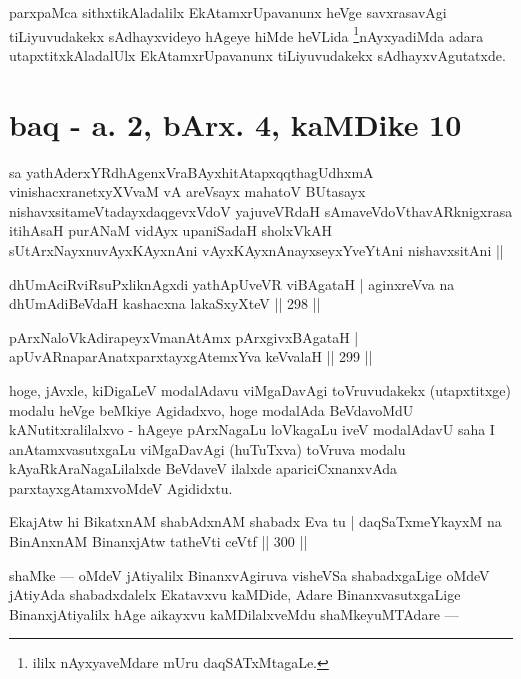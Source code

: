 \begin{artha}
parxpaMca sithxtikAladalilx EkAtamxrUpavanunx heVge savxrasavAgi tiLiyuvudakekx sAdhayxvideyo hAgeye hiMde heVLida \footnote[1]{ililx nAyxyaveMdare mUru daqSATxMtagaLe.}nAyxyadiMda adara utapxtitxkAladalUlx EkAtamxrUpavanunx tiLiyuvudakekx sAdhayxvAgutatxde.
\end{artha}



\section*{baq - a. 2, bArx. 4, kaMDike 10}

\begin{shl}
sa yathAderxYRdhAgenxVraBAyxhitAtapxqqthagUdhxmA vinishacxranetxyXVvaM vA areV\s sayx mahatoV BUtasayx nishavxsitameVtadayxdaqgevxVdoV yajuveVRdaH sAmaveVdoV\s thavARknigxrasa itihAsaH purANaM vidAyx upaniSadaH sholxVkAH sUtArxNayxnuvAyxKAyxnAni vAyxKAyxnAnayxseyxYveYtAni nishavxsitAni ||
\end{shl}

\begin{shl}
dhUmAciRviRsuPxliknAgxdi yathApUveVR viBAgataH |
aginxreVva na dhUmAdiBeVdaH kashacxna lakaSxyXteV \hfill || 298 ||
\end{shl}

\begin{shl}
pArxNaloVkAdirapeyxVmanAtAmx pArxgivxBAgataH |
apUvARnaparAnatxparxtayxgAtemxYva keVvalaH \hfill || 299 ||
\end{shl}

\begin{artha}
hoge, jAvxle, kiDigaLeV modalAdavu viMgaDavAgi toVruvudakekx (utapxtitxge) modalu heVge beMkiye Agidadxvo, hoge modalAda BeVdavoMdU kANutitxra\-lilalxvo - hAgeye pArxNagaLu loVkagaLu iveV modalAdavU saha I anAtamxvasutx\-gaLu viMgaDavAgi (huTuTxva) toVruva modalu kAyaRkAraNagaLilalxde \-BeVdaveV ilalxde apariciCxnanxvAda parxtayxgAtamxvoMdeV Agididxtu.
\end{artha}

\begin{shl}
EkajAtw hi BikatxnAM shabAdxnAM shabadx Eva tu |
daqSaTxmeYkayxM na BinAnxnAM BinanxjAtw tatheVti ceVtf \hfill || 300 ||
\end{shl}

\begin{artha}
shaMke  {\rm ---}  oMdeV jAtiyalilx BinanxvAgiruva visheVSa shabadxgaLige oMdeV jAtiyAda shabadxdalelx Ekatavxvu kaMDide, Adare BinanxvasutxgaLige BinanxjAtiyalilx hAge aikayxvu kaMDilalxveMdu shaMkeyuMTAdare  {\rm ---} 
\end{artha}

